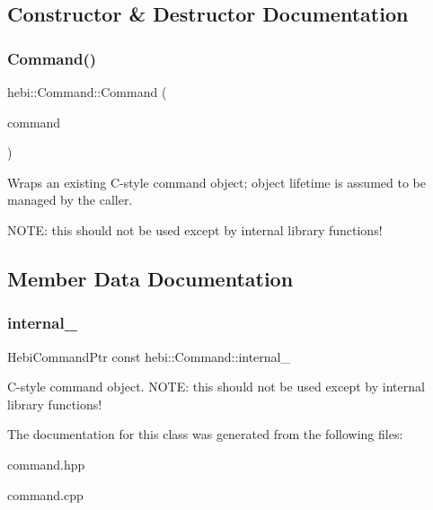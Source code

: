 \subsection{Constructor \& Destructor Documentation}
\mbox{\label{classhebi_1_1Command_a8f1e2bbe57e74cac0b3a6adf83634308}} 
\subsubsection{\texorpdfstring{Command()}{Command()}}
{\footnotesize\ttfamily hebi\+::\+Command\+::\+Command (\begin{DoxyParamCaption}\item[{Hebi\+Command\+Ptr}]{command }\end{DoxyParamCaption})}



Wraps an existing C-\/style command object; object lifetime is assumed to be managed by the caller. 

N\+O\+TE\+: this should not be used except by internal library functions! 

\subsection{Member Data Documentation}
\mbox{\label{classhebi_1_1Command_a54791e7ac42129f12d1525df809f3aae}} 
\subsubsection{\texorpdfstring{internal\+\_\+}{internal\_}}
{\footnotesize\ttfamily Hebi\+Command\+Ptr const hebi\+::\+Command\+::internal\+\_\+}

C-\/style command object. N\+O\+TE\+: this should not be used except by internal library functions! 

The documentation for this class was generated from the following files\+:\begin{DoxyCompactItemize}
\item 
command.\+hpp\item 
command.\+cpp\end{DoxyCompactItemize}

